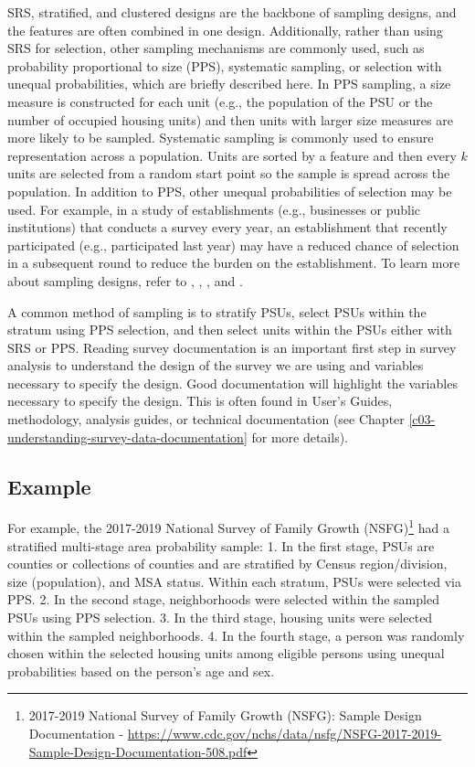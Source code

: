 \documentclass[
]{krantz}
\begin{document}
SRS, stratified, and clustered designs are the backbone of sampling designs, and the features are often combined in one design. Additionally, rather than using SRS for selection, other sampling mechanisms are commonly used, such as probability proportional to size (PPS), systematic sampling, or selection with unequal probabilities, which are briefly described here. In PPS sampling, a size measure is constructed for each unit (e.g., the population of the PSU or the number of occupied housing units) and then units with larger size measures are more likely to be sampled. Systematic sampling is commonly used to ensure representation across a population. Units are sorted by a feature and then every \(k\) units are selected from a random start point so the sample is spread across the population. In addition to PPS, other unequal probabilities of selection may be used. For example, in a study of establishments (e.g., businesses or public institutions) that conducts a survey every year, an establishment that recently participated (e.g., participated last year) may have a reduced chance of selection in a subsequent round to reduce the burden on the establishment. To learn more about sampling designs, refer to \citet{valliant2013practical}, \citet{cox2011business}, \citet{cochran1977sampling}, and \citet{deming1991sample}.

A common method of sampling is to stratify PSUs, select PSUs within the stratum using PPS selection, and then select units within the PSUs either with SRS or PPS. Reading survey documentation is an important first step in survey analysis to understand the design of the survey we are using and variables necessary to specify the design. Good documentation will highlight the variables necessary to specify the design. This is often found in User's Guides, methodology, analysis guides, or technical documentation (see Chapter \ref{c03-understanding-survey-data-documentation} for more details).

\hypertarget{example-6}{%
\subsection*{Example}\label{example-6}}


For example, the 2017-2019 National Survey of Family Growth (NSFG)\footnote{2017-2019 National Survey of Family Growth (NSFG): Sample Design Documentation - \url{https://www.cdc.gov/nchs/data/nsfg/NSFG-2017-2019-Sample-Design-Documentation-508.pdf}} had a stratified multi-stage area probability sample:
1. In the first stage, PSUs are counties or collections of counties and are stratified by Census region/division, size (population), and MSA status. Within each stratum, PSUs were selected via PPS.
2. In the second stage, neighborhoods were selected within the sampled PSUs using PPS selection.
3. In the third stage, housing units were selected within the sampled neighborhoods.
4. In the fourth stage, a person was randomly chosen within the selected housing units among eligible persons using unequal probabilities based on the person's age and sex.
\end{document}
